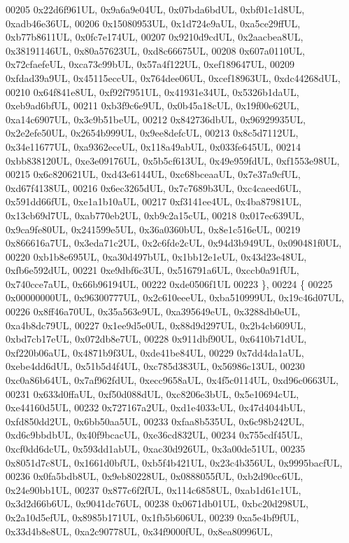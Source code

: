 \begin{DoxyCode}
00205     0x22d6f961UL, 0x9a6a9e04UL, 0x07bda6bdUL, 0xbf01c1d8UL, 0xadb46e36UL,
00206     0x15080953UL, 0x1d724e9aUL, 0xa5ce29ffUL, 0xb77b8611UL, 0x0fc7e174UL,
00207     0x9210d9cdUL, 0x2aacbea8UL, 0x38191146UL, 0x80a57623UL, 0xd8c66675UL,
00208     0x607a0110UL, 0x72cfaefeUL, 0xca73c99bUL, 0x57a4f122UL, 0xef189647UL,
00209     0xfdad39a9UL, 0x45115eccUL, 0x764dee06UL, 0xcef18963UL, 0xdc44268dUL,
00210     0x64f841e8UL, 0xf92f7951UL, 0x41931e34UL, 0x5326b1daUL, 0xeb9ad6bfUL,
00211     0xb3f9c6e9UL, 0x0b45a18cUL, 0x19f00e62UL, 0xa14c6907UL, 0x3c9b51beUL,
00212     0x842736dbUL, 0x96929935UL, 0x2e2efe50UL, 0x2654b999UL, 0x9ee8defcUL,
00213     0x8c5d7112UL, 0x34e11677UL, 0xa9362eceUL, 0x118a49abUL, 0x033fe645UL,
00214     0xbb838120UL, 0xe3e09176UL, 0x5b5cf613UL, 0x49e959fdUL, 0xf1553e98UL,
00215     0x6c820621UL, 0xd43e6144UL, 0xc68bceaaUL, 0x7e37a9cfUL, 0xd67f4138UL,
00216     0x6ec3265dUL, 0x7c7689b3UL, 0xc4caeed6UL, 0x591dd66fUL, 0xe1a1b10aUL,
00217     0xf3141ee4UL, 0x4ba87981UL, 0x13cb69d7UL, 0xab770eb2UL, 0xb9c2a15cUL,
00218     0x017ec639UL, 0x9ca9fe80UL, 0x241599e5UL, 0x36a0360bUL, 0x8e1c516eUL,
00219     0x866616a7UL, 0x3eda71c2UL, 0x2c6fde2cUL, 0x94d3b949UL, 0x090481f0UL,
00220     0xb1b8e695UL, 0xa30d497bUL, 0x1bb12e1eUL, 0x43d23e48UL, 0xfb6e592dUL,
00221     0xe9dbf6c3UL, 0x516791a6UL, 0xccb0a91fUL, 0x740cce7aUL, 0x66b96194UL,
00222     0xde0506f1UL
00223   \},
00224   \{
00225     0x00000000UL, 0x96300777UL, 0x2c610eeeUL, 0xba510999UL, 0x19c46d07UL,
00226     0x8ff46a70UL, 0x35a563e9UL, 0xa395649eUL, 0x3288db0eUL, 0xa4b8dc79UL,
00227     0x1ee9d5e0UL, 0x88d9d297UL, 0x2b4cb609UL, 0xbd7cb17eUL, 0x072db8e7UL,
00228     0x911dbf90UL, 0x6410b71dUL, 0xf220b06aUL, 0x4871b9f3UL, 0xde41be84UL,
00229     0x7dd4da1aUL, 0xebe4dd6dUL, 0x51b5d4f4UL, 0xc785d383UL, 0x56986c13UL,
00230     0xc0a86b64UL, 0x7af962fdUL, 0xecc9658aUL, 0x4f5c0114UL, 0xd96c0663UL,
00231     0x633d0ffaUL, 0xf50d088dUL, 0xc8206e3bUL, 0x5e10694cUL, 0xe44160d5UL,
00232     0x727167a2UL, 0xd1e4033cUL, 0x47d4044bUL, 0xfd850dd2UL, 0x6bb50aa5UL,
00233     0xfaa8b535UL, 0x6c98b242UL, 0xd6c9bbdbUL, 0x40f9bcacUL, 0xe36cd832UL,
00234     0x755cdf45UL, 0xcf0dd6dcUL, 0x593dd1abUL, 0xac30d926UL, 0x3a00de51UL,
00235     0x8051d7c8UL, 0x1661d0bfUL, 0xb5f4b421UL, 0x23c4b356UL, 0x9995bacfUL,
00236     0x0fa5bdb8UL, 0x9eb80228UL, 0x0888055fUL, 0xb2d90cc6UL, 0x24e90bb1UL,
00237     0x877c6f2fUL, 0x114c6858UL, 0xab1d61c1UL, 0x3d2d66b6UL, 0x9041dc76UL,
00238     0x0671db01UL, 0xbc20d298UL, 0x2a10d5efUL, 0x8985b171UL, 0x1fb5b606UL,
00239     0xa5e4bf9fUL, 0x33d4b8e8UL, 0xa2c90778UL, 0x34f9000fUL, 0x8ea80996UL,

\end{DoxyCode}
